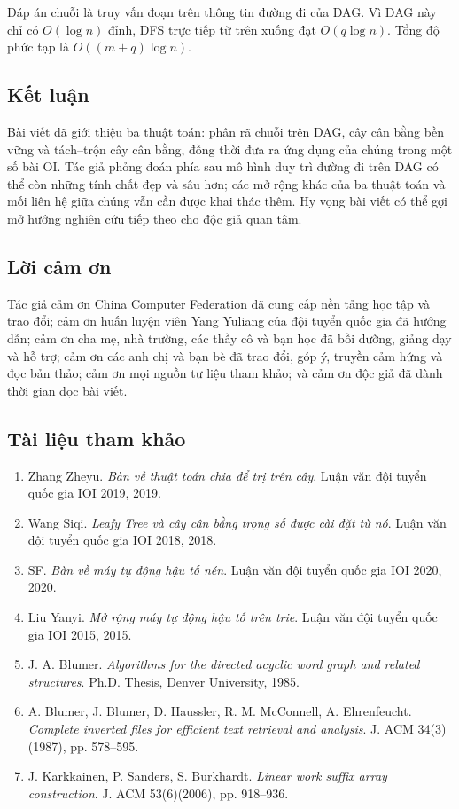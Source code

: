 \documentclass[11pt]{article}
\begin{document}
Đáp án chuỗi là truy vấn đoạn trên thông tin đường đi của DAG. Vì DAG này chỉ có
$O(\log n)$ đỉnh, DFS trực tiếp từ trên xuống đạt $O(q\log n)$. Tổng độ phức tạp
là $O((m+q)\log n)$.

\subsection*{Kết luận}

Bài viết đã giới thiệu ba thuật toán: phân rã chuỗi trên DAG, cây cân bằng bền
vững và tách--trộn cây cân bằng, đồng thời đưa ra ứng dụng của chúng trong một
số bài OI. Tác giả phỏng đoán phía sau mô hình duy trì đường đi trên DAG có thể
còn những tính chất đẹp và sâu hơn; các mở rộng khác của ba thuật toán và mối
liên hệ giữa chúng vẫn cần được khai thác thêm. Hy vọng bài viết có thể gợi mở
hướng nghiên cứu tiếp theo cho độc giả quan tâm.

\subsection*{Lời cảm ơn}

Tác giả cảm ơn China Computer Federation đã cung cấp nền tảng học tập và trao
đổi; cảm ơn huấn luyện viên Yang Yuliang của đội tuyển quốc gia đã hướng dẫn;
cảm ơn cha mẹ, nhà trường, các thầy cô và bạn học đã bồi dưỡng, giảng dạy và hỗ
trợ; cảm ơn các anh chị và bạn bè đã trao đổi, góp ý, truyền cảm hứng và đọc
bản thảo; cảm ơn mọi nguồn tư liệu tham khảo; và cảm ơn độc giả đã dành thời
gian đọc bài viết.

\subsection*{Tài liệu tham khảo}

\begin{enumerate}
  \item Zhang Zheyu. \emph{Bàn về thuật toán chia để trị trên cây}. Luận văn đội
  tuyển quốc gia IOI 2019, 2019.
  \item Wang Siqi. \emph{Leafy Tree và cây cân bằng trọng số được cài đặt từ nó}.
  Luận văn đội tuyển quốc gia IOI 2018, 2018.
  \item SF. \emph{Bàn về máy tự động hậu tố nén}. Luận văn đội tuyển quốc gia
  IOI 2020, 2020.
  \item Liu Yanyi. \emph{Mở rộng máy tự động hậu tố trên trie}. Luận văn đội
  tuyển quốc gia IOI 2015, 2015.
  \item J. A. Blumer. \emph{Algorithms for the directed acyclic word graph and
  related structures}. Ph.D. Thesis, Denver University, 1985.
  \item A. Blumer, J. Blumer, D. Haussler, R. M. McConnell, A. Ehrenfeucht.
  \emph{Complete inverted files for efficient text retrieval and analysis}.
  J. ACM 34(3)(1987), pp. 578--595.
  \item J. Karkkainen, P. Sanders, S. Burkhardt. \emph{Linear work suffix array
  construction}. J. ACM 53(6)(2006), pp. 918--936.
\end{enumerate}
\end{document}
